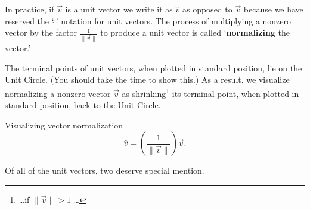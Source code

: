 \documentclass{ximera}
\begin{document}
 

  In practice, if $\overrightarrow{v}$ is a unit vector we write it as $\hat{v}$ as opposed to $\overrightarrow{v}$ because we have reserved the `$\hat{~}$' notation for unit vectors.  The process of multiplying a nonzero vector by the factor $\frac{1}{\| \overrightarrow{v} \|}$ to produce a unit vector is called  `\textbf{normalizing} the vector.'  
  
   
  
   The terminal points of unit vectors, when plotted in standard position, lie on the Unit Circle. (You should take the time to show this.)  As a result, we visualize normalizing a nonzero vector $\overrightarrow{v}$ as shrinking\footnote{\ldots if $\| \overrightarrow{v} \| > 1$ \ldots} its terminal point, when plotted in standard position, back to the Unit Circle.

\begin{center}


\vspace{1ex}

Visualizing vector normalization
\[
\hat{v}
=
\left(\frac{1}{\|\overrightarrow{v}\|}\right)\overrightarrow{v}.
\]

\end{center}

Of all of the unit vectors, two deserve special mention.
\end{document}
